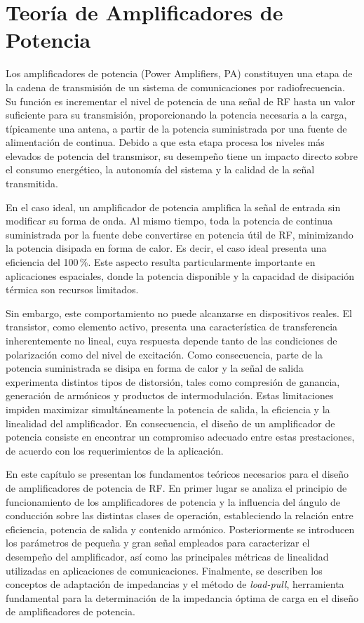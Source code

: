 \chapter[Teoría de Amplificadores de Potencia]{Teoría de Amplificadores de Potencia} \label{sec:teoria_pa}
Los amplificadores de potencia (Power Amplifiers, PA) constituyen una etapa de la cadena de transmisión de un sistema de comunicaciones por radiofrecuencia. Su función es incrementar el nivel de potencia de una señal de RF hasta un valor suficiente para su transmisión, proporcionando la potencia necesaria a la carga, típicamente una antena, a partir de la potencia suministrada por una fuente de alimentación de continua. Debido a que esta etapa procesa los niveles más elevados de potencia del transmisor, su desempeño tiene un impacto directo sobre el consumo energético, la autonomía del sistema y la calidad de la señal transmitida.

En el caso ideal, un amplificador de potencia amplifica la señal de entrada sin modificar su forma de onda. Al mismo tiempo, toda la potencia de continua suministrada por la fuente debe convertirse en potencia útil de RF, minimizando la potencia disipada en forma de calor. Es decir, el caso ideal presenta una eficiencia del 100\,\%. Este aspecto resulta particularmente importante en aplicaciones espaciales, donde la potencia disponible y la capacidad de disipación térmica son recursos limitados.

Sin embargo, este comportamiento no puede alcanzarse en dispositivos reales. El transistor, como elemento activo, presenta una característica de transferencia inherentemente no lineal, cuya respuesta depende tanto de las condiciones de polarización como del nivel de excitación. Como consecuencia, parte de la potencia suministrada se disipa en forma de calor y la señal de salida experimenta distintos tipos de distorsión, tales como compresión de ganancia, generación de armónicos y productos de intermodulación. Estas limitaciones impiden maximizar simultáneamente la potencia de salida, la eficiencia y la linealidad del amplificador. En consecuencia, el diseño de un amplificador de potencia consiste en encontrar un compromiso adecuado entre estas prestaciones, de acuerdo con los requerimientos de la aplicación.

En este capítulo se presentan los fundamentos teóricos necesarios para el diseño de amplificadores de potencia de RF. En primer lugar se analiza el principio de funcionamiento de los amplificadores de potencia y la influencia del ángulo de conducción sobre las distintas clases de operación, estableciendo la relación entre eficiencia, potencia de salida y contenido armónico. Posteriormente se introducen los parámetros de pequeña y gran señal empleados para caracterizar el desempeño del amplificador, así como las principales métricas de linealidad utilizadas en aplicaciones de comunicaciones. Finalmente, se describen los conceptos de adaptación de impedancias y el método de \textit{load-pull}, herramienta fundamental para la determinación de la impedancia óptima de carga en el diseño de amplificadores de potencia.

